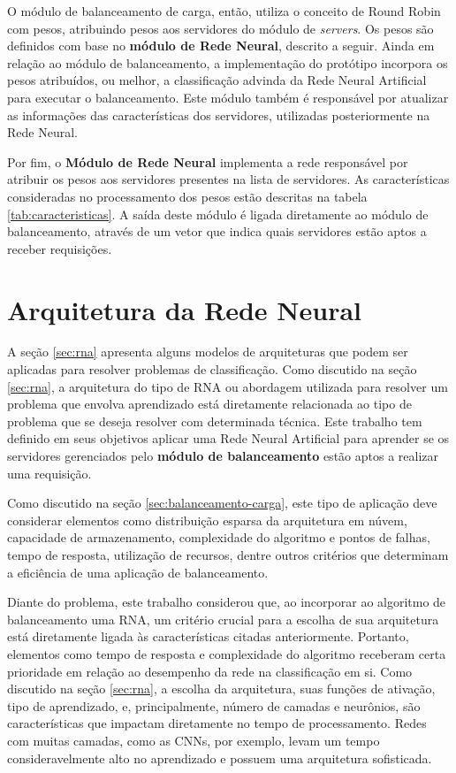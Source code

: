 O módulo de balanceamento de carga, então, utiliza o conceito de Round Robin com pesos, atribuindo pesos aos servidores do módulo de \textit{servers}. Os pesos são definidos com base no \textbf{módulo de Rede Neural}, descrito a seguir. Ainda em relação ao módulo de balanceamento, a implementação do protótipo incorpora os pesos atribuídos, ou  melhor, a classificação advinda da Rede Neural Artificial para executar o balanceamento. Este módulo também é responsável por atualizar as informações das características dos servidores, utilizadas posteriormente na Rede Neural. 

Por fim, o \textbf{Módulo de Rede Neural} implementa a rede responsável por atribuir os pesos aos servidores presentes na lista de servidores. As características consideradas no processamento dos pesos estão descritas na tabela \ref{tab:caracteristicas}. A saída deste módulo é ligada diretamente ao módulo de balanceamento, através de um vetor que indica quais servidores estão aptos a receber requisições. 

\section{Arquitetura da Rede Neural}\label{sec:ann}

A seção \ref{sec:rna} apresenta alguns modelos de arquiteturas que podem ser aplicadas para resolver problemas de classificação. Como discutido na seção \ref{sec:rna}, a arquitetura do tipo de RNA ou abordagem utilizada para resolver um problema que envolva aprendizado está diretamente relacionada ao tipo de problema que se deseja resolver com determinada técnica. Este trabalho tem definido em seus objetivos aplicar uma Rede Neural Artificial para aprender se os servidores gerenciados pelo \textbf{módulo de balanceamento} estão aptos a realizar uma requisição. 

Como discutido na seção \ref{sec:balanceamento-carga}, este tipo de aplicação deve considerar elementos como distribuição esparsa da arquitetura em núvem, capacidade de armazenamento, complexidade do algoritmo e pontos de falhas, tempo de resposta, utilização de recursos, dentre outros critérios que determinam a eficiência de uma aplicação de balanceamento. 

Diante do problema, este trabalho considerou que, ao incorporar ao algoritmo de balanceamento uma RNA, um critério crucial para a escolha de sua arquitetura está diretamente ligada às características citadas anteriormente. Portanto, elementos como tempo de resposta e complexidade do algoritmo receberam certa prioridade em relação ao desempenho da rede na classificação em si. Como discutido na seção \ref{sec:rna}, a escolha da arquitetura, suas funções de ativação, tipo de aprendizado, e, principalmente, número de camadas e neurônios, são características que impactam diretamente no tempo de processamento. Redes com muitas camadas, como as CNNs, por exemplo, levam um tempo consideravelmente alto no aprendizado e possuem uma arquitetura sofisticada. 

